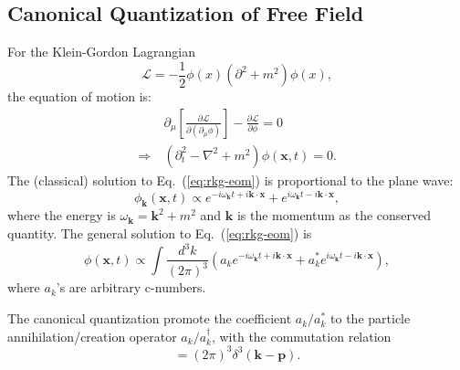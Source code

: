 \subsection{Canonical Quantization of Free Field}

For the Klein-Gordon Lagrangian
\begin{equation}
	\mathcal L = -\frac{1}{2}\phi(x)(\partial^2+m^2)\phi(x),
\end{equation}
the equation of motion is:
\begin{equation}\label{eq:rkg-eom}
\begin{aligned}
	&\ \partial_\mu \left[\frac{\partial \mathcal L}{\partial(\partial_\mu \phi)}\right] - \frac{\partial \mathcal L}{\partial \phi} = 0 \\
	\Rightarrow &\
	(\partial_t^2-\nabla^2+m^2)\phi(\bm x,t) = 0.
\end{aligned}
\end{equation}
The (classical) solution to Eq.~(\ref{eq:rkg-eom}) is proportional to the plane wave:
\begin{equation}
	\phi_{\bm k}(\bm x, t) \propto e^{-i\omega_{\bm{k}}t+i\bm{k}\cdot\bm{x}} + e^{i\omega_{\bm{k}}t-i\bm{k}\cdot\bm{x}},
\end{equation}
where the energy is $\omega_{\bm{k}}=\bm{k}^2+m^2$ and $\bm k$ is the momentum as the conserved quantity.
The general solution to Eq.~(\ref{eq:rkg-eom}) is
\begin{equation}
	\phi(\bm x,t) \propto \int \frac{d^{3} k}{(2\pi)^{3}} \left(
		a_{k}e^{-i\omega_{\bm{k}}t+i\bm{k}\cdot\bm{x}} + 
		a^*_{k}e^{i\omega_{\bm{k}}t-i\bm{k}\cdot\bm{x}} 
	\right),
\end{equation}
where $a_k$'s are arbitrary c-numbers.

The canonical quantization promote the coefficient $a_{k}/a_{k}^*$ to the particle annihilation/creation operator $a_{k}/a_{k}^\dagger$, with the commutation relation
\begin{equation}
	[a_{k}, a_{p}^\dagger] = (2\pi)^{3} \delta^{3}(\bm{k}-\bm{p}).
\end{equation}


